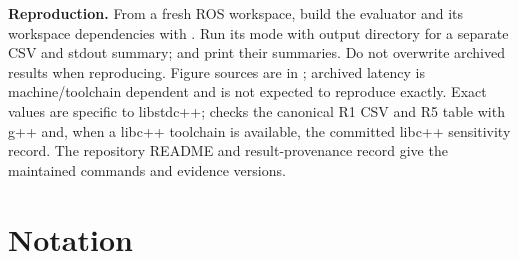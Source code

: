 \noindent\textbf{Reproduction.} From a fresh ROS workspace, build the evaluator and its workspace dependencies with . Run its  mode with output directory  for a separate CSV and stdout summary;  and  print their summaries. Do not overwrite archived results when reproducing. Figure sources are in ; archived latency is machine/toolchain dependent and is not expected to reproduce exactly. Exact values are specific to libstdc++;  checks the canonical R1 CSV and R5 table with g++ and, when a libc++ toolchain is available, the committed libc++ sensitivity record. The repository README and result-provenance record give the maintained commands and evidence versions.

\section{Notation}\label{app:notation}

